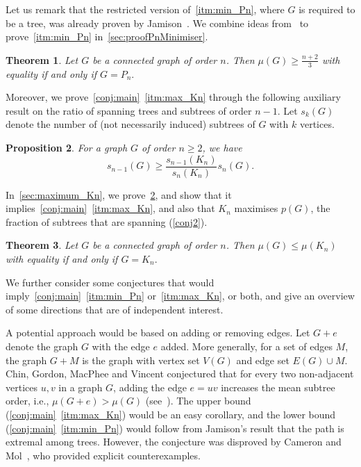 \documentclass[11pt]{article}
\newtheorem{thr}{Theorem}[section]
\newtheorem{prop}[thr]{Proposition}
\theoremstyle{definition}
\begin{document}
Let us remark that the restricted version of~\ref{itm:min_Pn}, where $G$ is required to be a tree, was already proven by Jamison~\cite{jamison_average_1983}. We combine ideas from~\cite{John22, Vince22} to prove~\ref{itm:min_Pn} in~\cref{sec:proofPnMinimiser}.

\begin{thr}\label{thr:Pn_istheminimiser}
    Let $G$ be a connected graph of order $n$.
    Then $\mu(G) \ge \frac{n+2}{3}$ with equality if and only if $G=P_n.$
\end{thr}

Moreover, we prove~\cref{conj:main}~\ref{itm:max_Kn} through the following auxiliary result on the ratio of spanning trees and subtrees of order $n-1$. Let $s_k(G)$ denote the number of (not necessarily induced) subtrees of $G$ with $k$ vertices.

\begin{prop}\label{redconj_Kn}
 For a graph $G$ of order $n\ge 2$, we have 
$$s_{n-1}(G) \ge \frac{s_{n-1}(K_n)}{s_n(K_n)} s_n(G).$$
\end{prop}

In~\cref{sec:maximum_Kn}, we prove~\cref{redconj_Kn}, and show that it implies~\cref{conj:main}~\ref{itm:max_Kn}, and also that $K_n$ maximises $p(G)$, the fraction of subtrees that are spanning (\cref{conj2}).

\begin{thr}\label{thr:Kn_isthemaximiser}
    Let $G$ be a connected graph of order $n$.
    Then $\mu(G) \le \mu(K_n)$ with equality if and only if $G=K_n.$
\end{thr}

We further consider some conjectures that would imply~\cref{conj:main}~\ref{itm:min_Pn} or~\ref{itm:max_Kn}, or both, and give an overview of some directions that are of independent interest.

A potential approach would be based on adding or removing edges. Let $G+e$ denote the graph $G$ with the edge $e$ added. More generally, for a set of edges $M$, the graph $G+M$ is the graph with vertex set $V(G)$ and edge set $E(G) \cup M$. Chin, Gordon, MacPhee and Vincent conjectured that for every two non-adjacent vertices $u,v$ in a graph $G$, adding the edge $e=uv$ increases the mean subtree order, i.e., $\mu(G+e)>\mu(G)$ (see~\cite[Conj.~7.4]{CGMV18}). The upper bound (\cref{conj:main}~\ref{itm:max_Kn}) would be an easy corollary, and the lower bound (\cref{conj:main}~\ref{itm:min_Pn}) would follow from Jamison's result that the path is extremal among trees. However, the conjecture was disproved by Cameron and Mol~\cite{CM21}, who provided explicit counterexamples.
\end{document}
